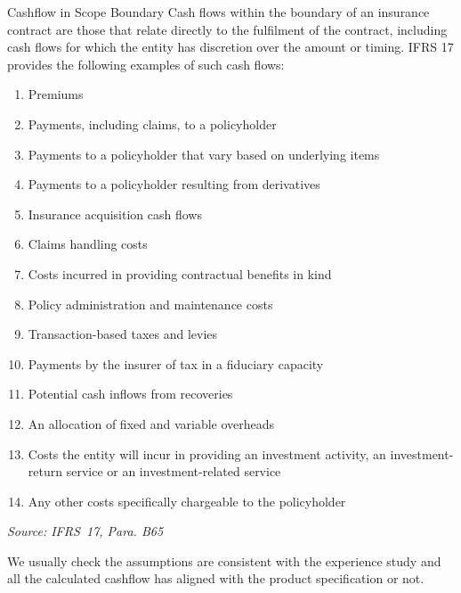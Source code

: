 \documentclass[aspectratio=169]{beamer}
\begin{document}
\begin{frame}[allowframebreaks]{Cashflow in Scope Boundary}
  Cash flows within the boundary of an insurance contract are those that relate directly to the fulfilment of the contract, including cash flows for which the entity has discretion over the amount or timing. IFRS 17 provides the following
examples of such cash flows:
\begin{enumerate}
  \item Premiums
  \item Payments, including claims, to a policyholder
  \item Payments to a policyholder that vary based on underlying items
  \item Payments to a policyholder resulting from derivatives 
  \item Insurance acquisition cash flows
  \item Claims handling costs 
  \item Costs incurred in providing contractual benefits in kind 
  \item Policy administration and maintenance costs 
  \item Transaction-based taxes and levies 
  \item Payments by the insurer of tax in a fiduciary capacity 
  \item Potential cash inflows from recoveries 
  \item An allocation of fixed and variable overheads 
  \item Costs the entity will incur in providing an investment activity, an investment-return service or an investment-related service
  \item Any other costs specifically chargeable to the policyholder 
\end{enumerate}
\footnotesize
\textit{Source: IFRS~17, Para. B65} \\
\normalsize
\begin{tcolorbox}[colback=green!5,colframe=green!40!black,title=Audit Checkbox]
We usually check the assumptions are consistent with the experience study and all the calculated cashflow has aligned with the product specification or not. 
\end{tcolorbox}
\end{frame}
\end{document}
